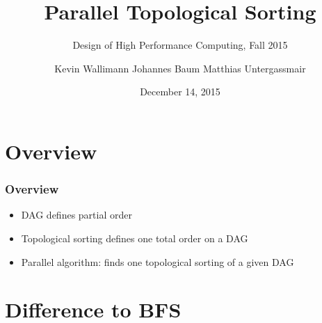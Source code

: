 
\usepackage{wrapfig}
\author[]{Kevin Wallimann \quad Johannes Baum \quad Matthias Untergassmair}


\title[Topological Sorting]{Parallel Topological Sorting} %
\subtitle{Design of High Performance Computing, Fall 2015}

\date{December 14, 2015}
	

\begin{frame}
\titlepage %
\end{frame}


\section{Overview}


\begin{frame}
\frametitle{Overview}

\begin{itemize}
\item DAG defines partial order
\item Topological sorting defines one total order on a DAG
\item Parallel algorithm: finds one topological sorting of a given DAG
\end{itemize}

\end{frame}

\section{Difference to BFS}

